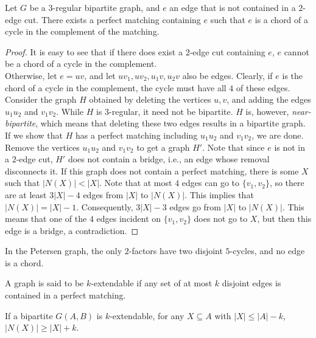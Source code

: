 	\begin{fdef}
		Let $G$ be a $3$-regular bipartite graph, and $e$ an edge that is not contained in a $2$-edge cut. There exists a perfect matching containing $e$ such that $e$ is a chord of a cycle in the complement of the matching.
	\end{fdef}
	\begin{proof}
		It is easy to see that if there does exist a $2$-edge cut containing $e$, $e$ cannot be a chord of a cycle in the complement.\\
		Otherwise, let $e = uv$, and let $uv_1,uv_2,u_1v,u_2v$ also be edges. Clearly, if $e$ is the chord of a cycle in the complement, the cycle must have all $4$ of these edges. Consider the graph $H$ obtained by deleting the vertices $u,v$, and adding the edges $u_1u_2$ and $v_1v_2$. While $H$ is $3$-regular, it need not be bipartite. $H$ is, however, \emph{near-bipartite}, which means that deleting these two edges results in a bipartite graph.\\
		If we show that $H$ has a perfect matching including $u_1u_2$ and $v_1v_2$, we are done. Remove the vertices $u_1u_2$ and $v_1v_2$ to get a graph $H'$. Note that since $e$ is not in a $2$-edge cut, $H'$ does not contain a bridge, i.e., an edge whose removal disconnects it. If this graph does not contain a perfect matching, there is some $X$ such that $|N(X)| < |X|$. Note that at most $4$ edges can go to $\{v_1,v_2\}$, so there are at least $3|X|-4$ edges from $|X|$ to $|N(X)|$. This implies that $|N(X)| = |X|-1$. Consequently, $3|X|-3$ edges go from $|X|$ to $|N(X)|$. This means that one of the $4$ edges incident on $\{v_1,v_2\}$ does not go to $X$, but then this edge is a bridge, a contradiction.
	\end{proof}

	In the Petersen graph, the only $2$-factors have two disjoint $5$-cycles, and no edge is a chord.

	\begin{fdef}
		A graph is said to be $k$-extendable if any set of at most $k$ disjoint edges is contained in a perfect matching.
	\end{fdef}

	\begin{fprop}
		If a bipartite $G(A,B)$ is $k$-extendable, for any $X \subseteq A$ with $|X| \le |A|-k$, $|N(X)| \ge |X|+k$.
	\end{fprop}